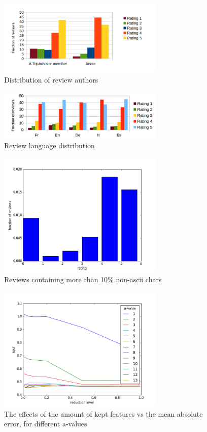\documentclass[a4paper,12pt]{article}
\begin{document}
\begin{figure}[H]
    \center
    \includegraphics[width=300px]{member_distr.png}
    \caption{Distribution of review authors}
    \label{fig:authorDistr}
\end{figure}

\begin{figure}[H]
    \center
    \includegraphics[width=300px]{lang_distr.png}
    \caption{Review language distribution}
    \label{fig:langDistr}
\end{figure}

\begin{figure}[H]
    \center
    \includegraphics[width=300px]{non-ascii.png}
    \caption{Reviews containing more than 10\% non-ascii chars}
    \label{fig:nonascii}
\end{figure}

\begin{figure}[H]
    \center
    \includegraphics[width=300px]{mae_a_redlevel.png}
    \caption{The effects of the amount of kept features vs the mean absolute error, for different a-values}
    \label{fig:preprop_hyper}
\end{figure}
\end{document}
